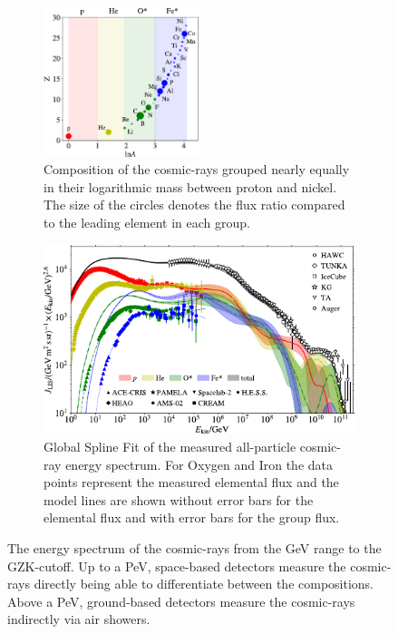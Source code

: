 \begin{figure}
    \centering
    \begin{subfigure}{0.9\textwidth}
        \centering
        \includegraphics[width=0.5\textwidth]{./images/cosmic_ray_composition.pdf}
        \caption{Composition of the cosmic-rays grouped nearly equally in their logarithmic mass between proton and nickel. The size of the circles denotes the flux ratio compared to the leading element in each group. \cite{Dembinski17GSF}}
        \label{fig:cr_components}
        \vspace{0.5cm}
    \end{subfigure}
    \begin{subfigure}{0.9\textwidth}
        \centering
        \includegraphics[width=\textwidth]{./images/cosmic_ray_spectrum.pdf}
        \caption{Global Spline Fit of the measured all-particle cosmic-ray energy spectrum. For Oxygen and Iron the data points represent the measured elemental flux and the model lines are shown without error bars for the elemental flux and with error bars for the group flux. \cite{Dembinski19MuonPuzzle}}
        \label{fig:cr_spectrum}
    \end{subfigure}
    \caption{The energy spectrum of the cosmic-rays from the GeV range to the GZK-cutoff. Up to a PeV, space-based detectors measure the cosmic-rays directly being able to differentiate between the compositions. Above a PeV, ground-based detectors measure the cosmic-rays indirectly via air showers.}
    \label{fig:cosmic_rays}
\end{figure}

